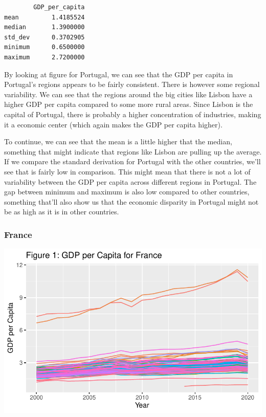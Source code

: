 \documentclass[
  a4paper,
  DIV=11,
  numbers=noendperiod]{scrartcl}
\begin{document}
\begin{verbatim}
        GDP_per_capita
mean         1.4185524
median       1.3900000
std_dev      0.3702905
minimum      0.6500000
maximum      2.7200000
\end{verbatim}

By looking at figure for Portugal, we can see that the GDP per capita in
Portugal's regions appears to be fairly consistent. There is however
some regional variability. We can see that the regions around the big
cities like Lisbon have a higher GDP per capita compared to some more
rural areas. Since Lisbon is the capital of Portugal, there is probably
a higher concentration of industries, making it a economic center (which
again makes the GDP per capita higher).

To continue, we can see that the mean is a little higher that the
median, something that might indicate that regions like Lisbon are
pulling up the average. If we compare the standard derivation for
Portugal with the other countries, we'll see that is fairly low in
comparison. This might mean that there is not a lot of variability
between the GDP per capita across different regions in Portugal. The gap
between minimum and maximum is also low compared to other countries,
something that'll also show us that the economic disparity in Portugal
might not be as high as it is in other countries.

\hypertarget{france}{%
\subsubsection{France}\label{france}}

\includegraphics{assignment_1_files/figure-pdf/unnamed-chunk-10-1.pdf}
\end{document}
